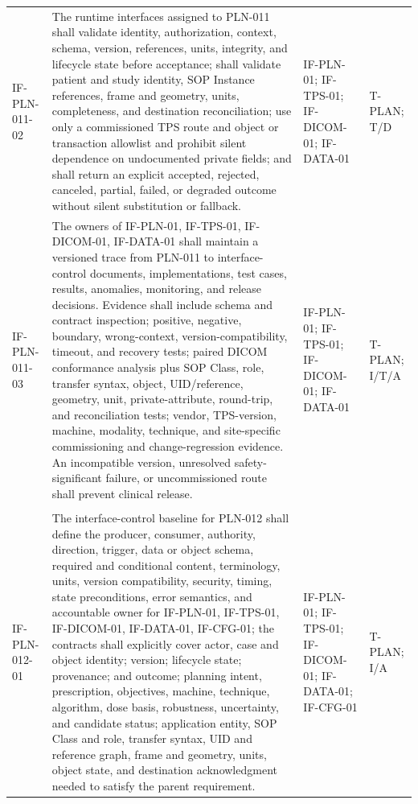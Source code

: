 \documentclass[11pt,letterpaper]{article}
\begin{document}
\begin{scriptsize}
\begin{longtable}{@{}L{0.14\textwidth}L{0.49\textwidth}L{0.19\textwidth}L{0.10\textwidth}@{}}
\addlinespace[2pt]
\mbox{IF-PLN-011-02} & The runtime interfaces assigned to PLN-011 shall validate identity, authorization, context, schema, version, references, units, integrity, and lifecycle state before acceptance; shall validate patient and study identity, SOP Instance references, frame and geometry, units, completeness, and destination reconciliation; use only a commissioned TPS route and object or transaction allowlist and prohibit silent dependence on undocumented private fields; and shall return an explicit accepted, rejected, canceled, partial, failed, or degraded outcome without silent substitution or fallback. & IF-PLN-01; IF-TPS-01; IF-DICOM-01; IF-DATA-01 & T-PLAN; T\slash\allowbreak{}D \\
\addlinespace[2pt]
\mbox{IF-PLN-011-03} & The owners of IF-PLN-01, IF-TPS-01, IF-DICOM-01, IF-DATA-01 shall maintain a versioned trace from PLN-011 to interface-control documents, implementations, test cases, results, anomalies, monitoring, and release decisions. Evidence shall include schema and contract inspection; positive, negative, boundary, wrong-context, version-compatibility, timeout, and recovery tests; paired DICOM conformance analysis plus SOP Class, role, transfer syntax, object, UID\slash\allowbreak{}reference, geometry, unit, private-attribute, round-trip, and reconciliation tests; vendor, TPS-version, machine, modality, technique, and site-specific commissioning and change-regression evidence. An incompatible version, unresolved safety-significant failure, or uncommissioned route shall prevent clinical release. & IF-PLN-01; IF-TPS-01; IF-DICOM-01; IF-DATA-01 & T-PLAN; I\slash\allowbreak{}T\slash\allowbreak{}A \\
\addlinespace[2pt]
 \\
\addlinespace[2pt]
\mbox{IF-PLN-012-01} & The interface-control baseline for PLN-012 shall define the producer, consumer, authority, direction, trigger, data or object schema, required and conditional content, terminology, units, version compatibility, security, timing, state preconditions, error semantics, and accountable owner for IF-PLN-01, IF-TPS-01, IF-DICOM-01, IF-DATA-01, IF-CFG-01; the contracts shall explicitly cover actor, case and object identity; version; lifecycle state; provenance; and outcome; planning intent, prescription, objectives, machine, technique, algorithm, dose basis, robustness, uncertainty, and candidate status; application entity, SOP Class and role, transfer syntax, UID and reference graph, frame and geometry, units, object state, and destination acknowledgment needed to satisfy the parent requirement. & IF-PLN-01; IF-TPS-01; IF-DICOM-01; IF-DATA-01; IF-CFG-01 & T-PLAN; I\slash\allowbreak{}A \\

\end{longtable}
\end{scriptsize}
\end{document}
